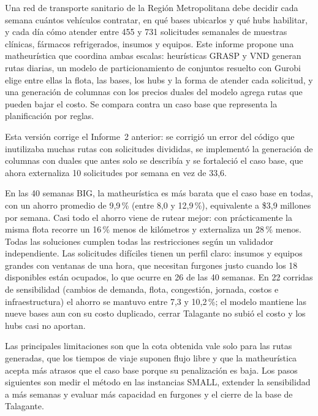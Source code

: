 Una red de transporte sanitario de la Región Metropolitana debe decidir cada semana cuántos vehículos contratar, en qué bases ubicarlos y qué hubs habilitar, y cada día cómo atender entre 455 y 731 solicitudes semanales de muestras clínicas, fármacos refrigerados, insumos y equipos. Este informe propone una matheurística que coordina ambas escalas: heurísticas GRASP y VND generan rutas diarias, un modelo de particionamiento de conjuntos resuelto con Gurobi elige entre ellas la flota, las bases, los hubs y la forma de atender cada solicitud, y una generación de columnas con los precios duales del modelo agrega rutas que pueden bajar el costo. Se compara contra un caso base que representa la planificación por reglas.

Esta versión corrige el Informe~2 anterior: se corrigió un error del código que inutilizaba muchas rutas con solicitudes divididas, se implementó la generación de columnas con duales que antes solo se describía y se fortaleció el caso base, que ahora externaliza 10 solicitudes por semana en vez de 33,6.

En las 40 semanas BIG, la matheurística es más barata que el caso base en todas, con un ahorro promedio de 9,9\,\% (entre 8,0 y 12,9\,\%), equivalente a \$3,9 millones por semana. Casi todo el ahorro viene de rutear mejor: con prácticamente la misma flota recorre un 16\,\% menos de kilómetros y externaliza un 28\,\% menos. Todas las soluciones cumplen todas las restricciones según un validador independiente. Las solicitudes difíciles tienen un perfil claro: insumos y equipos grandes con ventanas de una hora, que necesitan furgones justo cuando los 18 disponibles están ocupados, lo que ocurre en 26 de las 40 semanas. En 22 corridas de sensibilidad (cambios de demanda, flota, congestión, jornada, costos e infraestructura) el ahorro se mantuvo entre 7,3 y 10,2\,\%; el modelo mantiene las nueve bases aun con su costo duplicado, cerrar Talagante no subió el costo y los hubs casi no aportan.

Las principales limitaciones son que la cota obtenida vale solo para las rutas generadas, que los tiempos de viaje suponen flujo libre y que la matheurística acepta más atrasos que el caso base porque su penalización es baja. Los pasos siguientes son medir el método en las instancias SMALL, extender la sensibilidad a más semanas y evaluar más capacidad en furgones y el cierre de la base de Talagante.
